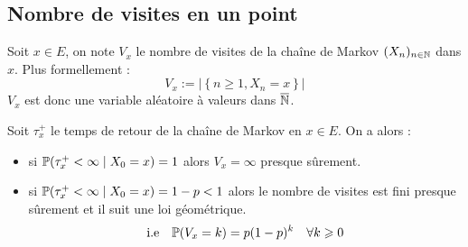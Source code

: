 \subsection{Nombre de visites en un point}

\begin{definition}
    Soit $x \in E$, on note $V_x$ le nombre de visites de la chaîne de Markov $(X_n)_{n \in \mathbb{N}}$ dans $x$. 
    Plus formellement : 
        $$ \boxed{V_x := \left| \left\{ n \geqslant 1 , X_n = x \right\}\right|} $$ 
    $V_x$ est donc une variable aléatoire à valeurs dans $ \overline{ \mathbb{N}}$. 
\end{definition}

\begin{theorem}
    Soit $ \tau_x^+$ le temps de retour de la chaîne de Markov en $x \in E$. On a alors : 
    \begin{itemize} 
        \item si $ \mathbb{P}( \tau_x^+ < \infty \; | \; X_0 = x) = 1$ alors $V_x = \infty$ presque sûrement. 
        \item si $ \mathbb{P}( \tau_x^+ < \infty \; | \; X_0 = x) = 1 - p < 1$ alors le nombre de visites est fini 
        presque sûrement et il suit une loi géométrique. 
            \[ \text{i.e} \quad \mathbb{P}(V_x = k) = p (1 - p)^k \quad \forall k \geqslant 0  \] 
    \end{itemize}
\end{theorem}

